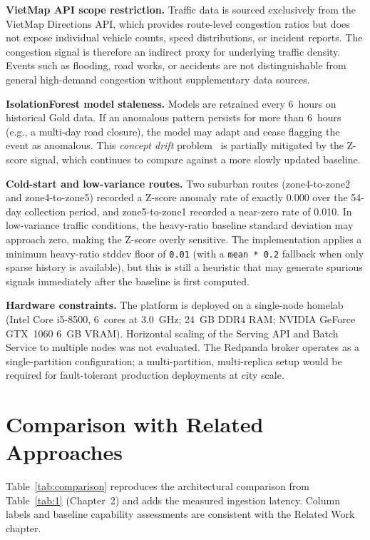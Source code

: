\textbf{VietMap API scope restriction.}
Traffic data is sourced exclusively from the VietMap Directions API, which
provides route-level congestion ratios but does not expose individual vehicle
counts, speed distributions, or incident reports. The congestion signal is
therefore an indirect proxy for underlying traffic density. Events such as
flooding, road works, or accidents are not distinguishable from general
high-demand congestion without supplementary data sources.

\textbf{IsolationForest model staleness.}
Models are retrained every 6~hours on historical Gold data. If an anomalous
pattern persists for more than 6~hours (e.g., a multi-day road closure), the
model may adapt and cease flagging the event as anomalous. This
\textit{concept drift} problem~\cite{chandola2009anomaly} is partially
mitigated by the Z-score signal, which continues to compare against a more
slowly updated baseline.

\textbf{Cold-start and low-variance routes.}
Two suburban routes (zone4-to-zone2 and zone4-to-zone5) recorded a Z-score
anomaly rate of exactly 0.000 over the 54-day collection period, and
zone5-to-zone1 recorded a near-zero rate of 0.010. In low-variance
traffic conditions, the heavy-ratio baseline standard deviation may approach
zero, making the Z-score overly sensitive. The implementation applies a
minimum heavy-ratio stddev floor of \texttt{0.01} (with a \texttt{mean * 0.2}
fallback when only sparse history is available), but this is still a heuristic
that may generate spurious signals immediately after the baseline is first
computed.

\textbf{Hardware constraints.}
The platform is deployed on a single-node homelab (Intel Core i5-8500,
6~cores at 3.0~GHz; 24~GB DDR4 RAM; NVIDIA GeForce GTX~1060 6~GB VRAM).
Horizontal scaling of the Serving API and Batch Service to multiple nodes
was not evaluated. The Redpanda broker operates as a single-partition
configuration; a multi-partition, multi-replica setup would be required
for fault-tolerant production deployments at city scale.

\section{Comparison with Related Approaches}
\label{sec:comparison}

Table~\ref{tab:comparison} reproduces the architectural comparison from
Table~\ref{tab:1} (Chapter~2) and adds the measured ingestion latency.
Column labels and baseline capability assessments are consistent with the
Related Work chapter.

